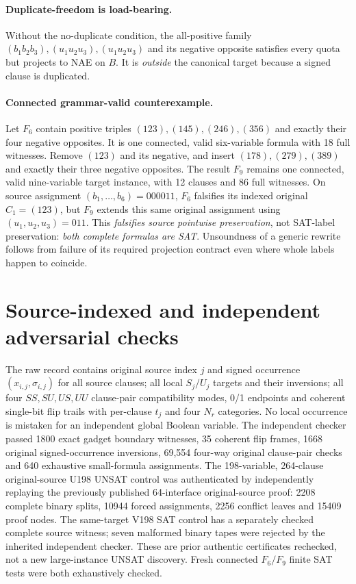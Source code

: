 \documentclass[11pt]{article}
\begin{document}
\paragraph{Duplicate-freedom is load-bearing.} Without the no-duplicate condition, the all-positive family $(b_1b_2b_3),(u_1u_2u_3),(u_1u_2u_3)$ and its negative opposite satisfies every quota but projects to NAE on $B$. It is \emph{outside} the canonical target because a signed clause is duplicated.

\paragraph{Connected grammar-valid counterexample.} Let $F_6$ contain positive triples $(123),(145),(246),(356)$ and exactly their four negative opposites. It is one connected, valid six-variable formula with 18 full witnesses. Remove $(123)$ and its negative, and insert $(178),(279),(389)$ and exactly their three negative opposites. The result $F_9$ remains one connected, valid nine-variable target instance, with 12 clauses and 86 full witnesses. On source assignment $(b_1,\ldots,b_6)=000011$, $F_6$ falsifies its indexed original $C_1=(123)$, but $F_9$ extends this same original assignment using $(u_1,u_2,u_3)=011$. This \emph{falsifies source pointwise preservation}, not SAT-label preservation: \emph{both complete formulas are SAT}. Unsoundness of a generic rewrite follows from failure of its required projection contract even where whole labels happen to coincide.

\section{Source-indexed and independent adversarial checks}
The raw record contains original source index $j$ and signed occurrence $(x_{i,j},\sigma_{i,j})$ for all source clauses; all local $S_j/U_j$ targets and their inversions; all four $SS,SU,US,UU$ clause-pair compatibility modes, 0/1 endpoints and coherent single-bit flip trails with per-clause $t_j$ and four $N_r$ categories. No local occurrence is mistaken for an independent global Boolean variable.
The independent checker passed 1800 exact gadget boundary witnesses, 35 coherent flip frames, 1668 original signed-occurrence inversions, 69,554 four-way original clause-pair checks and 640 exhaustive small-formula assignments. The 198-variable, 264-clause original-source U198 UNSAT control was authenticated by independently replaying the previously published 64-interface original-source proof: 2208 complete binary splits, 10944 forced assignments, 2256 conflict leaves and 15409 proof nodes. The same-target V198 SAT control has a separately checked complete source witness; seven malformed binary tapes were rejected by the inherited independent checker. These are prior authentic certificates rechecked, not a new large-instance UNSAT discovery. Fresh connected $F_6/F_9$ finite SAT tests were both exhaustively checked.
\end{document}
